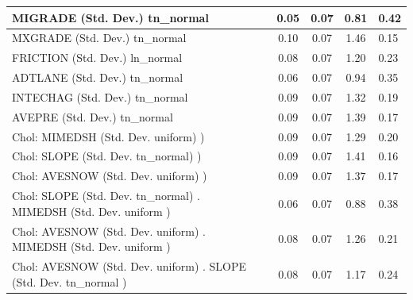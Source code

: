 \begin{table}
\begin{center}
\begin{tabular}{|l|l|c|c|c|l|}
			\hline
			MIGRADE (Std. Dev.) tn_normal &  & 0.05 & 0.07 & 0.81 & 0.42 \\
			\hline
			MXGRADE (Std. Dev.) tn_normal &  & 0.10 & 0.07 & 1.46 & 0.15 \\
			\hline
			FRICTION (Std. Dev.) ln_normal &  & 0.08 & 0.07 & 1.20 & 0.23 \\
			\hline
			ADTLANE (Std. Dev.) tn_normal &  & 0.06 & 0.07 & 0.94 & 0.35 \\
			\hline
			INTECHAG (Std. Dev.) tn_normal &  & 0.09 & 0.07 & 1.32 & 0.19 \\
			\hline
			AVEPRE (Std. Dev.) tn_normal &  & 0.09 & 0.07 & 1.39 & 0.17 \\
			\hline
			 Chol: MIMEDSH (Std. Dev. uniform) ) &  & 0.09 & 0.07 & 1.29 & 0.20 \\
			\hline
			 Chol: SLOPE (Std. Dev. tn_normal) ) &  & 0.09 & 0.07 & 1.41 & 0.16 \\
			\hline
			 Chol: AVESNOW (Std. Dev. uniform) ) &  & 0.09 & 0.07 & 1.37 & 0.17 \\
			\hline
			 Chol: SLOPE (Std. Dev. tn_normal) . MIMEDSH (Std. Dev.   uniform ) &  & 0.06 & 0.07 & 0.88 & 0.38 \\
			\hline
			 Chol: AVESNOW (Std. Dev. uniform) . MIMEDSH (Std. Dev.   uniform ) &  & 0.08 & 0.07 & 1.26 & 0.21 \\
			\hline
			 Chol: AVESNOW (Std. Dev. uniform) . SLOPE (Std. Dev.   tn_normal ) &  & 0.08 & 0.07 & 1.17 & 0.24 \\
			\hline
		\end{tabular}
	\end{center}
\end{table}